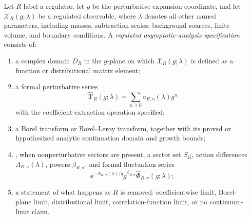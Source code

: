 \begin{definition}
\label{def:regulated-asymptotic-analysis-specification}
Let \(R\) label a regulator, let \(g\) be the perturbative expansion
coordinate, and let \(\mathcal X_R(g;\lambda)\) be a regulated observable,
where \(\lambda\) denotes all other named parameters, including masses,
subtraction scales, background sources, finite volume, and boundary
conditions.  A \emph{regulated asymptotic-analysis specification} consists of:
\begin{enumerate}
  \item a complex domain \(D_R\) in the \(g\)-plane on which
  \(\mathcal X_R(g;\lambda)\) is defined as a function or distributional
  matrix element;
  \item a formal perturbative series
  \[
    \widehat{\mathcal X}_R(g;\lambda)
    =
    \sum_{n\ge0}a_{R,n}(\lambda)g^n
  \]
  with the coefficient-extraction operation specified;
  \item a Borel transform or Borel--Leroy transform, together with its proved
  or hypothesized analytic continuation domain and growth bounds;
  \item, when nonperturbative sectors are present, a sector set \(S_R\), action
  differences \(A_{R,\sigma}(\lambda)\), powers \(\beta_{R,\sigma}\), and
  formal fluctuation series
  \[
    \ee^{-A_{R,\sigma}(\lambda)/g}g^{\beta_{R,\sigma}}
    \widehat\Phi_{R,\sigma}(g;\lambda);
  \]
  \item a statement of what happens as \(R\) is removed: coefficientwise limit,
  Borel-plane limit, distributional limit, correlation-function limit, or no
  continuum-limit claim.
\end{enumerate}
\end{definition}

